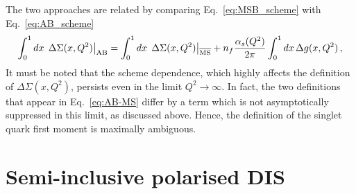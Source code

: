 The two approaches are related by comparing Eq.~\eqref{eq:MSB_scheme} with Eq.~\eqref{eq:AB_scheme}
\begin{equation}
  \int_{0}^{1} dx \, \left. \Delta \Sigma (x,Q^2) \right|_{\textrm{AB}} = \int_{0}^{1} dx \, \left. \Delta \Sigma (x,Q^2) \right|_{\overline{\textrm{MS}}} + n_f \frac{\alpha_s(Q^2)}{2\pi}  \int_0^1 dx \, \Delta g(x,Q^2)\,,
  \label{eq:AB-MS}
\end{equation}
It must be noted that the scheme dependence, which highly affects the definition of $\Delta \Sigma (x,Q^2)$, persists even in the limit $Q^2 \rightarrow \infty$. In fact, the two definitions that appear in Eq.~\eqref{eq:AB-MS} differ by a term which is not asymptotically suppressed in this limit, as discussed above. Hence, the definition of the singlet quark first moment is maximally ambiguous.

\section{Semi-inclusive polarised DIS}
\label{sec:SIDIS}

